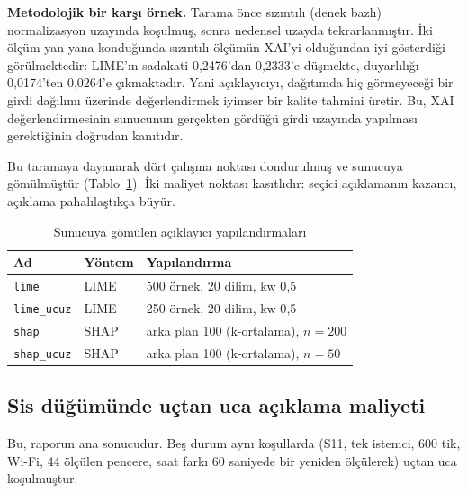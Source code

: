 \documentclass[conference]{IEEEtran}
\begin{document}
\textbf{Metodolojik bir karşı örnek.} Tarama önce sızıntılı (denek bazlı)
normalizasyon uzayında koşulmuş, sonra nedensel uzayda tekrarlanmıştır. İki
ölçüm yan yana konduğunda sızıntılı ölçümün XAI'yi olduğundan iyi gösterdiği
görülmektedir: LIME'ın sadakati 0{,}2476'dan 0{,}2333'e düşmekte, duyarlılığı
0{,}0174'ten 0{,}0264'e çıkmaktadır. Yani açıklayıcıyı, dağıtımda hiç
görmeyeceği bir girdi dağılımı üzerinde değerlendirmek iyimser bir kalite
tahmini üretir. Bu, XAI değerlendirmesinin sunucunun gerçekten gördüğü girdi
uzayında yapılması gerektiğinin doğrudan kanıtıdır.

Bu taramaya dayanarak dört çalışma noktası dondurulmuş ve sunucuya gömülmüştür
(Tablo~\ref{tab:secilen}). İki maliyet noktası kasıtlıdır: seçici açıklamanın
kazancı, açıklama pahalılaştıkça büyür.

\begin{table}[t]
\caption{Sunucuya gömülen açıklayıcı yapılandırmaları}
\label{tab:secilen}
\centering
\small
\begin{tabular}{llp{3.2cm}}
\toprule
\textbf{Ad} & \textbf{Yöntem} & \textbf{Yapılandırma}\\
\midrule
\texttt{lime}      & LIME & 500 örnek, 20 dilim, kw 0{,}5\\
\texttt{lime\_ucuz}& LIME & 250 örnek, 20 dilim, kw 0{,}5\\
\texttt{shap}      & SHAP & arka plan 100 (k-ortalama), $n{=}200$\\
\texttt{shap\_ucuz}& SHAP & arka plan 100 (k-ortalama), $n{=}50$\\
\bottomrule
\end{tabular}
\end{table}

\subsection{Sis düğümünde uçtan uca açıklama maliyeti}
\label{sec:fog-xai}

Bu, raporun ana sonucudur. Beş durum aynı koşullarda (S11, tek istemci, 600 tik,
Wi-Fi, 44 ölçülen pencere, saat farkı 60 saniyede bir yeniden ölçülerek) uçtan
uca koşulmuştur.
\end{document}

